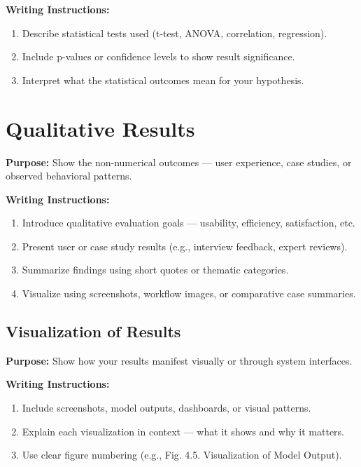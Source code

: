 {\color{red}\textbf{Writing Instructions:}
\begin{enumerate}
    \item Describe statistical tests used (t-test, ANOVA, correlation, regression).
    
    \item Include p-values or confidence levels to show result significance.
    
    \item Interpret what the statistical outcomes mean for your hypothesis.
\end{enumerate}}



\section{Qualitative Results}

{\color{blue}\textbf{Purpose:}
Show the non-numerical outcomes — user experience, case studies, or observed behavioral patterns.} \\

{\color{red}\textbf{Writing Instructions:}
\begin{enumerate}
    \item Introduce qualitative evaluation goals — usability, efficiency, satisfaction, etc.
    
    \item Present user or case study results (e.g., interview feedback, expert reviews).
    
    \item Summarize findings using short quotes or thematic categories.
    
    \item Visualize using screenshots, workflow images, or comparative case summaries.
\end{enumerate}}


\subsection{Visualization of Results}

{\color{blue}\textbf{Purpose:}
Show how your results manifest visually or through system interfaces.} \\

{\color{red}\textbf{Writing Instructions:}
\begin{enumerate}
    \item Include screenshots, model outputs, dashboards, or visual patterns.
    
    \item Explain each visualization in context — what it shows and why it matters.
    
    \item Use clear figure numbering (e.g., Fig. 4.5. Visualization of Model Output).
\end{enumerate}}


